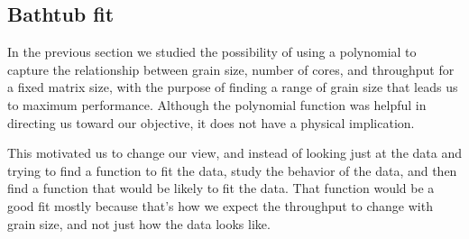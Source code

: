 \subsection{Bathtub fit}
In the previous section we studied the possibility of using a polynomial to capture the relationship between grain size, number of cores, and throughput for a fixed matrix size, with the purpose of finding a range of grain size that leads us to maximum performance. 
Although the polynomial function was helpful in directing us toward our objective, it does not have a physical implication. 

This motivated us to change our view, and instead of looking just at the data and trying to find a function to fit the data, study the behavior of the data, and then find a function that would be likely to fit the data. That function would be a good fit mostly because that's how we expect the throughput to change with grain size, and not just how the data looks like.   


